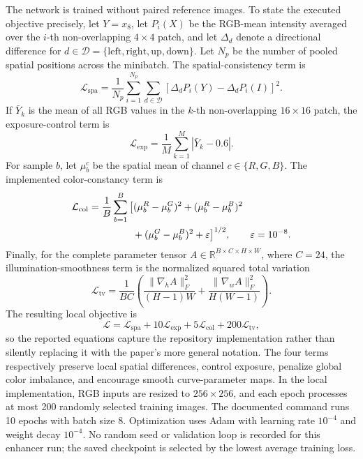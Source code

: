 \documentclass[11pt,a4paper]{article}
\begin{document}
The network is trained without paired reference images. To state the executed
objective precisely, let \(Y=x_8\), let \(P_i(X)\) be the RGB-mean intensity
averaged over the \(i\)-th non-overlapping \(4\times4\) patch, and let
\(\Delta_d\) denote a directional difference for
\(d\in\mathcal{D}=\{\mathrm{left},\mathrm{right},\mathrm{up},\mathrm{down}\}\).
Let \(N_p\) be the number of pooled spatial positions across the minibatch.
The spatial-consistency term is
\begin{equation}
 \mathcal{L}_{\mathrm{spa}}
 =\frac{1}{N_p}\sum_{i=1}^{N_p}\sum_{d\in\mathcal{D}}
 \left[\Delta_dP_i(Y)-\Delta_dP_i(I)\right]^2.
\end{equation}
If \(\bar{Y}_k\) is the mean of all RGB values in the \(k\)-th
non-overlapping \(16\times16\) patch, the exposure-control term is
\begin{equation}
 \mathcal{L}_{\mathrm{exp}}
 =\frac{1}{M}\sum_{k=1}^{M}\left|\bar{Y}_k-0.6\right|.
\end{equation}
For sample \(b\), let \(\mu_b^c\) be the spatial mean of channel
\(c\in\{R,G,B\}\). The implemented color-constancy term is
\begin{equation}
 \begin{aligned}
 \mathcal{L}_{\mathrm{col}}
 &=\frac{1}{B}\sum_{b=1}^{B}
 \big[(\mu_b^R-\mu_b^G)^2+(\mu_b^R-\mu_b^B)^2\\
 &\hspace{4.5em}+(\mu_b^G-\mu_b^B)^2+\varepsilon\big]^{1/2},
 \qquad \varepsilon=10^{-8}.
 \end{aligned}
\end{equation}
Finally, for the complete parameter tensor
\(A\in\mathbb{R}^{B\times C\times H\times W}\), where \(C=24\), the
illumination-smoothness term is the normalized squared total variation
\begin{equation}
 \mathcal{L}_{\mathrm{tv}}
 =\frac{1}{BC}\left(
 \frac{\lVert\nabla_hA\rVert_F^2}{(H-1)W}
 +\frac{\lVert\nabla_wA\rVert_F^2}{H(W-1)}
 \right).
\end{equation}
The resulting local objective is
\begin{equation}
\mathcal{L}=
\mathcal{L}_{\mathrm{spa}}+
10\mathcal{L}_{\mathrm{exp}}+
5\mathcal{L}_{\mathrm{col}}+
200\mathcal{L}_{\mathrm{tv}},
\end{equation}
so the reported equations capture the repository implementation rather than
silently replacing it with the paper's more general notation. The four terms
respectively preserve local spatial differences, control exposure, penalize
global color imbalance, and encourage smooth curve-parameter maps. In the local
implementation, RGB inputs are
resized to \(256\times256\), and each epoch processes at most 200 randomly
selected training images. The documented command runs 10 epochs with batch size
8. Optimization uses Adam with learning rate \(10^{-4}\) and weight decay
\(10^{-4}\). No random seed or validation loop is recorded for this enhancer
run; the saved checkpoint is selected by the lowest average training loss.
\end{document}
